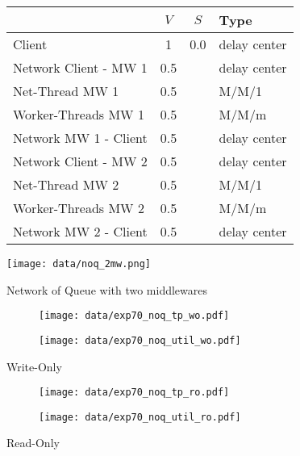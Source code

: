 \documentclass[report.tex]{subfiles}
\begin{document}
\begin{figure}
	\begin{minipage}[c]{0.45\linewidth}
		\centering
		\scriptsize{
			\begin{tabular}{|l|c|c|l|}
				\hline 
				& $V$ & $S$ & Type \Tstrut\\ 
				\hline 
				Client & 1 & 0.0  & delay center \Tstrut\\ 
				\hline 
				Network Client - MW 1 & 0.5 &  & delay center \Tstrut\\ 
				Net-Thread MW 1 & 0.5 &  & M/M/1 \\ 
				Worker-Threads MW 1 & 0.5 &  & M/M/m  \\ 
				Network MW 1 - Client & 0.5 &  & delay center \\ 
				\hline 
				Network Client - MW 2 & 0.5 &  & delay center \Tstrut\\  
				Net-Thread MW 2 & 0.5 &  & M/M/1 \\ 
				Worker-Threads MW 2 & 0.5 &  & M/M/m  \\
				Network MW 2 - Client & 0.5 &  & delay center \\ 
				\hline 
			\end{tabular} 
		} 
	\end{minipage}
	\hspace{0.5cm}
	\begin{minipage}[c]{0.45\linewidth}
		\centering
		\texttt{[image: data/noq\_2mw.png]}
	\end{minipage}
	\caption{Network of Queue with two middlewares}
	\label{exp70_noq_2mw}
\end{figure}


\begin{figure}
	\begin{subfigure}[b]{.49\linewidth}
		\centering
		\texttt{[image: data/exp70\_noq\_tp\_wo.pdf]}
	\end{subfigure}\hfill
	\begin{subfigure}[b]{.49\linewidth}
		\centering
		\texttt{[image: data/exp70\_noq\_util\_wo.pdf]}
	\end{subfigure}%
	\caption{Write-Only}\label{exp70_noq_wo}
\end{figure}

\begin{figure}
	\begin{subfigure}[b]{.49\linewidth}
		\centering
		\texttt{[image: data/exp70\_noq\_tp\_ro.pdf]}
	\end{subfigure}\hfill
	\begin{subfigure}[b]{.49\linewidth}
		\centering
		\texttt{[image: data/exp70\_noq\_util\_ro.pdf]}
	\end{subfigure}%
	\caption{Read-Only}\label{exp70_noq_ro}
\end{figure}

\end{document}
